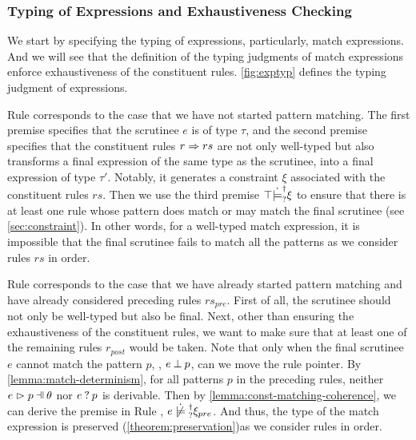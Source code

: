 \subsubsection{Typing of Expressions and Exhaustiveness Checking} \label{sec:exptyp}

We start by specifying the typing of expressions, particularly, match
expressions. And we will see that the definition of the typing judgments of
match expressions enforce exhaustiveness of the constituent rules.
\autoref{fig:exptyp} defines the typing judgment of expressions.


Rule \TMatchZPre corresponds to the case that we have not started pattern
matching. The first premise specifies that the scrutinee $e$ is of type $\tau$,
and the second premise specifies that the constituent rules $r \Rightarrow rs$ are not only
well-typed but also transforms a final expression of the same type as the
scrutinee, into a final expression of type $\tau'$. Notably, it generates a
constraint $\xi$ associated with the constituent rules $rs$. Then we use the
third premise $\top \dot{\models}_{?}^{\dag} \xi$ to ensure that there is at least
one rule whose pattern does match or may match the final scrutinee (see
\autoref{sec:constraint}). In other words, for a well-typed match expression,
it is impossible that the final scrutinee fails to match all the patterns as we
consider rules $rs$ in order.

Rule \TMatchNZPre corresponds to the case that we have already started pattern
matching and have already considered preceding rules $rs_{pre}$. First of all,
the scrutinee should not only be well-typed but also be final. Next, other than
ensuring the exhaustiveness of the constituent rules, we want to make sure that
at least one of the remaining rules $r_{post}$ would be taken. Note
that only when the final scrutinee $e$ cannot match the pattern $p$, \ie,
$e \mathbin{\bot} p$, can we move the rule pointer. By
\autoref{lemma:match-determinism}, for all patterns $p$ in the preceding
rules, neither $\hpatmatch{e}{p}{\theta}$ nor $e \mathbin{?} p$ is derivable.
Then by \autoref{lemma:const-matching-coherence}, we can derive the premise
in Rule \TMatchNZPre, $\cnotsatisfyormay{e}{\xi_{pre}}$. And thus, the type of
the match expression is preserved (\autoref{theorem:preservation})as we consider rules in order.

